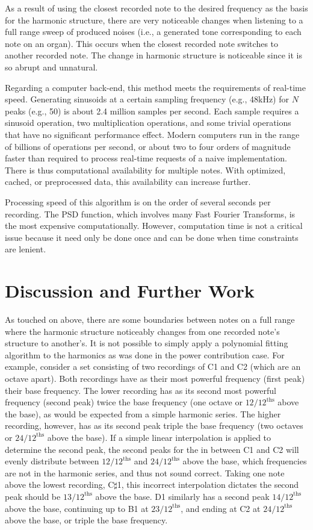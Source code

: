 \documentclass[twocolumn]{article}
\begin{document}
As a result of using the closest recorded note to the desired frequency as the basis for the harmonic structure, there are very noticeable changes when listening to a full range sweep of produced noises (i.e., a generated tone corresponding to each note on an organ). This occurs when the closest recorded note switches to another recorded note. The change in harmonic structure is noticeable since it is so abrupt and unnatural.

Regarding a computer back-end, this method meets the requirements of real-time speed. Generating sinusoids at a certain sampling frequency (e.g., 48kHz) for $N$ peaks (e.g., 50) is about 2.4 million samples per second. Each sample requires a sinusoid operation, two multiplication operations, and some trivial operations that have no significant performance effect. Modern computers run in the range of billions of operations per second, or about two to four orders of magnitude faster than required to process real-time requests of a naive implementation. There is thus computational availability for multiple notes. With optimized, cached, or preprocessed data, this availability can increase further.

Processing speed of this algorithm is on the order of several seconds per recording. The PSD function, which involves many Fast Fourier Transforms, is the most expensive computationally. However, computation time is not a critical issue because it need only be done once and can be done when time constraints are lenient.

\section{Discussion and Further Work}

As touched on above, there are some boundaries between notes on a full range where the harmonic structure noticeably changes from one recorded note's structure to another's. It is not possible to simply apply a polynomial fitting algorithm to the harmonics as was done in the power contribution case. For example, consider a set consisting of two recordings of C1 and C2 (which are an octave apart). Both recordings have as their most powerful frequency (first peak) their base frequency. The lower recording has as its second most powerful frequency (second peak) twice the base frequency (one octave or $12/12^\mathrm{ths}$ above the base), as would be expected from a simple harmonic series. The higher recording, however, has as its second peak triple the base frequency (two octaves or $24/12^\mathrm{ths}$ above the base). If a simple linear interpolation is applied to determine the second peak, the second peaks for the in between C1 and C2 will evenly distribute between $12/12^\mathrm{ths}$ and $24/12^\mathrm{ths}$ above the base, which frequencies are not in the harmonic series, and thus not sound correct. Taking one note above the lowest recording, C$\sharp$1, this incorrect interpolation dictates the second peak should be $13/12^\mathrm{ths}$ above the base. D1 similarly has a second peak $14/12^\mathrm{ths}$ above the base, continuing up to B1 at $23/12^\mathrm{ths}$, and ending at C2 at $24/12^\mathrm{ths}$ above the base, or triple the base frequency.
\end{document}
